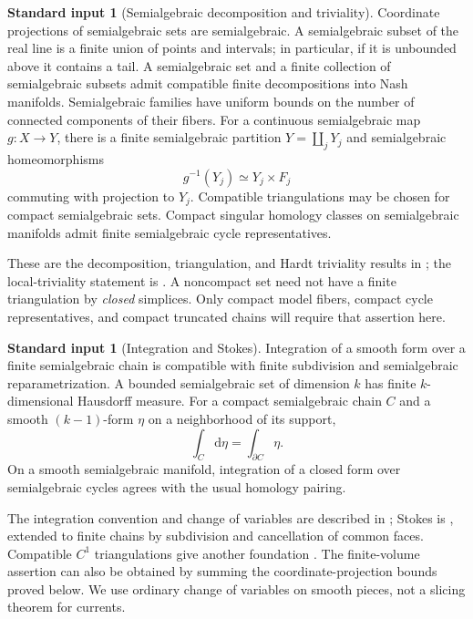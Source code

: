 \documentclass[11pt]{article}
\numberwithin{equation}{section}
\theoremstyle{definition}
\newtheorem{standard}[theorem]{Standard input}
\theoremstyle{remark}
\newcommand{\dd}{\mathrm d}
\begin{document}
\begin{standard}[Semialgebraic decomposition and triviality]\label{std:sa}
Coordinate projections of semialgebraic sets are semialgebraic. A
semialgebraic subset of the real line is a finite union of points and
intervals; in particular, if it is unbounded above it contains a tail.
A semialgebraic set and a finite collection of semialgebraic subsets admit
compatible finite decompositions into Nash manifolds. Semialgebraic
families have uniform bounds on the number of connected components of
their fibers. For a continuous semialgebraic map $g:X\to Y$, there is a
finite semialgebraic partition $Y=\coprod_jY_j$ and semialgebraic
homeomorphisms
\[
 g^{-1}(Y_j)\simeq Y_j\times F_j
\]
commuting with projection to $Y_j$. Compatible triangulations may be
chosen for compact semialgebraic sets. Compact singular homology classes
on semialgebraic manifolds admit finite semialgebraic cycle representatives.
\end{standard}

These are the decomposition, triangulation, and Hardt triviality results
in \cite{BCR,Hardt}; the local-triviality statement is
\cite[Theorem 9.3.2]{BCR}. A noncompact set need not have a finite
triangulation by \emph{closed} simplices. Only compact model fibers, compact cycle representatives,
and compact truncated chains will require that assertion here.

\begin{standard}[Integration and Stokes]\label{std:stokes}
Integration of a smooth form over a finite semialgebraic chain is
compatible with finite subdivision and semialgebraic reparametrization.
A bounded semialgebraic set of dimension $k$ has finite $k$-dimensional
Hausdorff measure. For a compact semialgebraic chain $C$ and a smooth
$(k-1)$-form $\eta$ on a neighborhood of its support,
\[
 \int_C\dd\eta=\int_{\partial C}\eta.
\]
On a smooth semialgebraic manifold, integration of a closed form over
semialgebraic cycles agrees with the usual homology pairing.
\end{standard}

The integration convention and change of variables are described in
\cite[Sections 1--2]{HKT}; Stokes is \cite[Theorem 2.9]{HKT}, extended to
finite chains by subdivision and cancellation of common faces. Compatible
$C^1$ triangulations give another foundation \cite{OS}. The finite-volume
assertion can also be obtained by summing the coordinate-projection
bounds proved below. We use ordinary change of variables on smooth
pieces, not a slicing theorem for currents.
\end{document}
